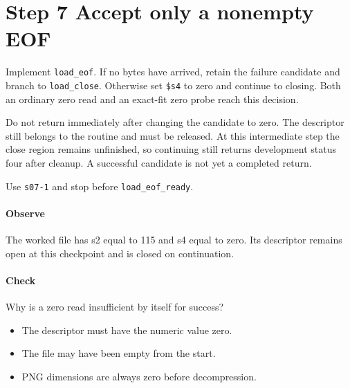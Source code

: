 \section{Step 7 Accept only a nonempty EOF}\label{png-load-s07}
Implement \texttt{load\_eof}. If no bytes have arrived, retain the failure candidate and branch to \texttt{load\_close}. Otherwise set \texttt{\$s4} to zero and continue to closing. Both an ordinary zero read and an exact-fit zero probe reach this decision.

Do not return immediately after changing the candidate to zero. The descriptor still belongs to the routine and must be released. At this intermediate step the close region remains unfinished, so continuing still returns development status four after cleanup. A successful candidate is not yet a completed return.

Use \texttt{s07-1} and stop before \texttt{load\_eof\_ready}.

\paragraph{Observe} The worked file has s2 equal to 115 and s4 equal to zero. Its descriptor remains open at this checkpoint and is closed on continuation.

\paragraph{Check} Why is a zero read insufficient by itself for success?
\begin{itemize}
  \item[A.] The descriptor must have the numeric value zero.
  \item[B.] The file may have been empty from the start.
  \item[C.] PNG dimensions are always zero before decompression.
\end{itemize}

